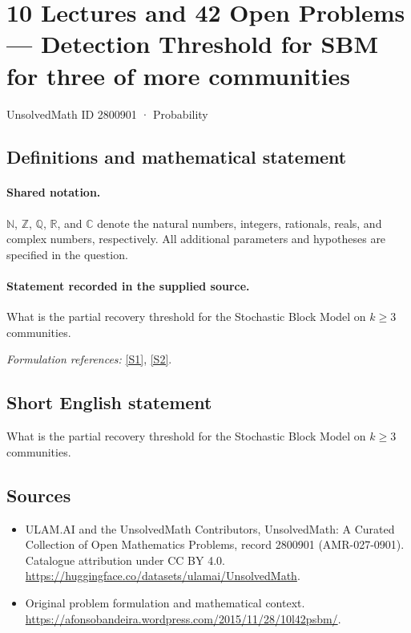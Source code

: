 \documentclass[11pt]{article}
\newcommand{\sref}[2]{\hyperlink{source:#1:#2}{[S#2]}}
\begin{document}
\setcounter{section}{2800900}
\section{10 Lectures and 42 Open Problems — Detection Threshold for SBM for three of more communities}\label{2800901}
{\small UnsolvedMath ID 2800901 · Probability}
\subsection{Definitions and mathematical statement}

\paragraph{Shared notation.}$\mathbb N$, $\mathbb Z$, $\mathbb Q$, $\mathbb R$, and $\mathbb C$ denote the natural numbers, integers, rationals, reals, and complex numbers, respectively. All additional parameters and hypotheses are specified in the question.


\paragraph{Statement recorded in the supplied source.}
What is the partial recovery threshold for the Stochastic Block Model on $k\geq 3$ communities.
\par\smallskip\textit{Formulation references:} \sref{2800901}{1}, \sref{2800901}{2}.
\subsection{Short English statement}
What is the partial recovery threshold for the Stochastic Block Model on $k\geq 3$ communities.
\subsection{Sources}
\begin{itemize}
\item[\hypertarget{source:2800901:1}{S1}] ULAM.AI and the UnsolvedMath Contributors, UnsolvedMath: A Curated Collection of Open Mathematics Problems, record 2800901 (AMR-027-0901). Catalogue attribution under CC BY 4.0.
\url{https://huggingface.co/datasets/ulamai/UnsolvedMath}.
\item[\hypertarget{source:2800901:2}{S2}] Original problem formulation and mathematical context.
\url{https://afonsobandeira.wordpress.com/2015/11/28/10l42psbm/}.
\end{itemize}
\label{end:2800901}
\end{document}
